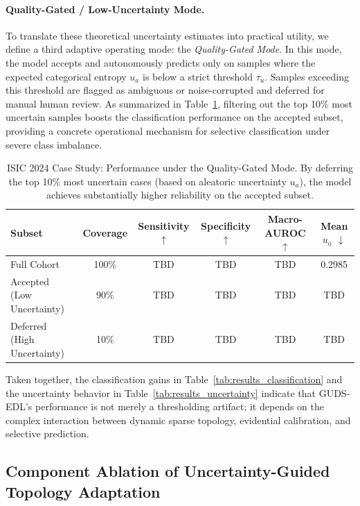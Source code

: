 \documentclass[letterpaper]{article} %
\begin{document}
\paragraph{Quality-Gated / Low-Uncertainty Mode.} To translate these theoretical uncertainty estimates into practical utility, we define a third adaptive operating mode: the \emph{Quality-Gated Mode}. In this mode, the model accepts and autonomously predicts only on samples where the expected categorical entropy $u_a$ is below a strict threshold $\tau_u$. Samples exceeding this threshold are flagged as ambiguous or noise-corrupted and deferred for manual human review. As summarized in Table~\ref{tab:quality_gated}, filtering out the top 10\% most uncertain samples boosts the classification performance on the accepted subset, providing a concrete operational mechanism for selective classification under severe class imbalance.

\begin{table}[!ht]
\centering
\caption{ISIC 2024 Case Study: Performance under the Quality-Gated Mode. By deferring the top 10\% most uncertain cases (based on aleatoric uncertainty $u_a$), the model achieves substantially higher reliability on the accepted subset.}
\label{tab:quality_gated}
\begin{tabular}{l ccccc}
\toprule
\textbf{Subset} & \textbf{Coverage} & \textbf{Sensitivity} $\uparrow$ & \textbf{Specificity} $\uparrow$ & \textbf{Macro-AUROC} $\uparrow$ & \textbf{Mean $u_a$} $\downarrow$ \\
\midrule
Full Cohort & 100\% & TBD & TBD & TBD & 0.2985 \\
Accepted (Low Uncertainty) & 90\% & TBD & TBD & TBD & TBD \\
Deferred (High Uncertainty) & 10\% & TBD & TBD & TBD & TBD \\
\bottomrule
\end{tabular}
\end{table}

\FloatBarrier
Taken together, the classification gains in Table~\ref{tab:results_classification} and the uncertainty behavior in Table~\ref{tab:results_uncertainty} indicate that GUDS-EDL's performance is not merely a thresholding artifact; it depends on the complex interaction between dynamic sparse topology, evidential calibration, and selective prediction. 

\subsection{Component Ablation of Uncertainty-Guided Topology Adaptation}\label{subsec:ablation}
\end{document}
